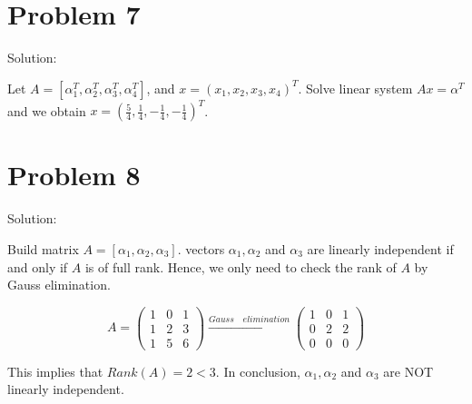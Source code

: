 \documentclass[12pt]{article}
\begin{document}
\section{Problem 7}
Solution: 

Let $A = [\alpha_1^T, \alpha_2^T, \alpha_3^T, \alpha_4^T]$, and $x = (x_1, x_2, x_3, x_4)^T$. Solve linear system $Ax = \alpha^T$ and we obtain $x = (\frac{5}{4}, \frac{1}{4}, -\frac{1}{4}, -\frac{1}{4})^T$.

\section{Problem 8}
Solution: 

Build matrix $A = [\alpha_1, \alpha_2, \alpha_3]$. vectors $\alpha_1, \alpha_2$ and $\alpha_3$ are linearly independent if and only if $A$ is of full rank. Hence, we only need to check the rank of $A$ by Gauss elimination.

$$
A = \begin{pmatrix}
1 & 0 & 1 \\
1 & 2 & 3 \\
1 & 5 & 6
\end{pmatrix} \xrightarrow {Gauss \quad elimination}
\begin{pmatrix}
1 & 0 & 1 \\
0 & 2 & 2 \\
0 & 0 & 0
\end{pmatrix}
$$

This implies that $Rank(A) = 2 < 3$. In conclusion, $\alpha_1, \alpha_2$ and $\alpha_3$ are NOT linearly independent.
\end{document}
